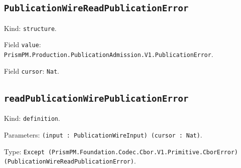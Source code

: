 \documentclass[11pt]{article}
\begin{document}
\subsection*{\texttt{PublicationWireReadPublicationError}}
\noindent Kind: \texttt{structure}.\par
\noindent Field \texttt{value}: \texttt{PrismPM.Production.PublicationAdmission.V1.PublicationError}.\par
\noindent Field \texttt{cursor}: \texttt{Nat}.\par
\subsection*{\texttt{readPublicationWirePublicationError}}
\noindent Kind: \texttt{definition}.\par
\noindent Parameters: \texttt{(input : PublicationWireInput) (cursor : Nat)}.\par
\noindent Type: \texttt{Except (PrismPM.Foundation.Codec.Cbor.V1.Primitive.CborError) (PublicationWireReadPublicationError)}.\par
\end{document}
